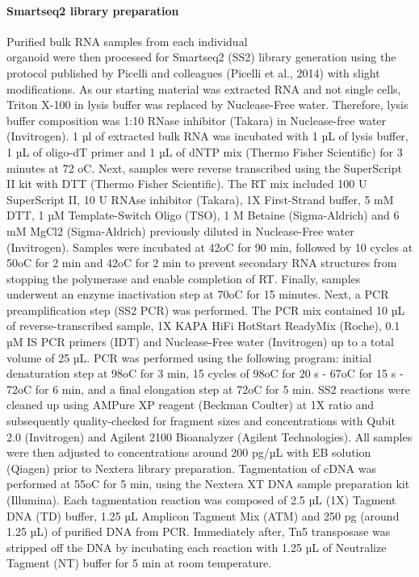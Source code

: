 \paragraph{Smartseq2 library preparation}
Purified bulk RNA samples from each individual\\organoid were then processed for Smartseq2 (SS2) library generation using the protocol published by Picelli and colleagues (Picelli et al., 2014) with slight modifications. As our starting material was extracted RNA and not single cells, Triton X-100 in lysis buffer was replaced by Nuclease-Free water. Therefore, lysis buffer composition was 1:10 RNase inhibitor (Takara) in Nuclease-free water (Invitrogen). 1 µl of extracted bulk RNA was incubated with 1 µL of lysis buffer, 1 µL of oligo-dT primer and 1 µL of dNTP mix (Thermo Fisher Scientific) for 3 minutes at 72 oC.
Next, samples were reverse transcribed using the SuperScript II kit with DTT (Thermo Fisher Scientific). The RT mix included 100 U SuperScript II, 10 U RNAse inhibitor (Takara), 1X First-Strand buffer, 5 mM DTT, 1 µM Template-Switch Oligo (TSO), 1 M Betaine (Sigma-Aldrich) and 6 mM MgCl2 (Sigma-Aldrich) previously diluted in Nuclease-Free water (Invitrogen). Samples were incubated at 42oC for 90 min, followed by 10 cycles at 50oC for 2 min and 42oC for 2 min to prevent secondary RNA structures from stopping the polymerase and enable completion of RT. Finally, samples underwent an enzyme inactivation step at 70oC for 15 minutes.
Next, a PCR preamplification step (SS2 PCR) was performed. The PCR mix contained 10 µL of reverse-transcribed sample, 1X KAPA HiFi HotStart ReadyMix (Roche), 0.1 µM IS PCR primers (IDT) and Nuclease-Free water (Invitrogen) up to a total volume of 25 µL. PCR was performed using the following program: initial denaturation step at 98oC for 3 min, 15 cycles of 98oC for 20 s - 67oC for 15 s - 72oC for 6 min, and a final elongation step at 72oC for 5 min.
SS2 reactions were cleaned up using AMPure XP reagent (Beckman Coulter) at 1X ratio and subsequently quality-checked for fragment sizes and concentrations with Qubit 2.0 (Invitrogen) and Agilent 2100 Bioanalyzer (Agilent Technologies). All samples were then adjusted to concentrations around 200 pg/µL with EB solution (Qiagen) prior to Nextera library preparation.
Tagmentation of cDNA was performed at 55oC for 5 min, using the Nextera XT DNA sample preparation kit (Illumina). Each tagmentation reaction was composed of 2.5 µL (1X) Tagment DNA (TD) buffer, 1.25 µL Amplicon Tagment Mix (ATM) and 250 pg (around 1.25 µL) of purified DNA from PCR. Immediately after, Tn5 transposase was stripped off the DNA by incubating each reaction with 1.25 µL of Neutralize Tagment (NT) buffer for 5 min at room temperature. 
